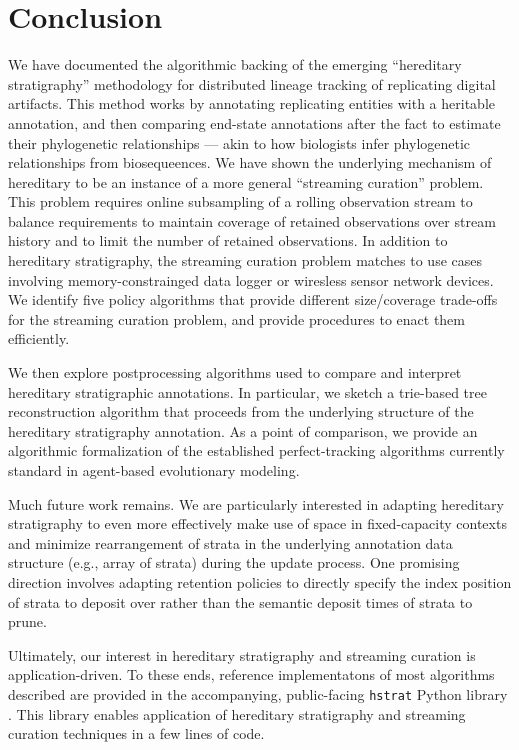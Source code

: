 \section{Conclusion} \label{sec:conclusion}

We have documented the algorithmic backing of the emerging ``hereditary stratigraphy'' methodology for distributed lineage tracking of replicating digital artifacts.
This method works by annotating replicating entities with a heritable annotation, and then comparing end-state annotations after the fact to estimate their phylogenetic relationships --- akin to how biologists infer phylogenetic relationships from biosequeences.
We have shown the underlying mechanism of hereditary to be an instance of a more general ``streaming curation'' problem.
This problem requires online subsampling of a rolling observation stream to balance requirements to maintain coverage of retained observations over stream history and to limit the number of retained observations.
In addition to hereditary stratigraphy, the streaming curation problem matches to use cases involving memory-constrainged data logger or wiresless sensor network devices.
We identify five policy algorithms that provide different size/coverage trade-offs for the streaming curation problem, and provide procedures to enact them efficiently.

We then explore postprocessing algorithms used to compare and interpret hereditary stratigraphic annotations.
In particular, we sketch a trie-based tree reconstruction algorithm that proceeds from the underlying structure of the hereditary stratigraphy annotation.
As a point of comparison, we provide an algorithmic formalization of the established perfect-tracking algorithms currently standard in agent-based evolutionary modeling.

Much future work remains.
We are particularly interested in adapting hereditary stratigraphy to even more effectively make use of space in fixed-capacity contexts and minimize rearrangement of strata in the underlying annotation data structure (e.g., array of strata) during the update process.
One promising direction involves adapting retention policies to directly specify the index position of strata to deposit over rather than the semantic deposit times of strata to prune.

Ultimately, our interest in hereditary stratigraphy and streaming curation is application-driven.
To these ends, reference implementatons of most algorithms described are provided in the accompanying, public-facing \texttt{hstrat} Python library \citep{moreno2022hstrat}.
This library enables application of hereditary stratigraphy and streaming curation techniques in a few lines of code.
